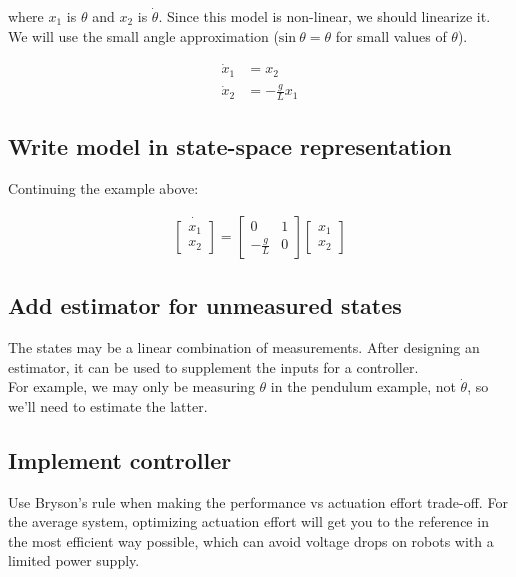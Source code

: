 \documentclass[10pt,conference,compsoc]{IEEEtran}
\begin{document}
where $x_1$ is $\theta$ and $x_2$ is $\dot{\theta}$. Since this model is
non-linear, we should linearize it. We will use the small angle approximation
($\mathrm{sin}~\theta = \theta$ for small values of $\theta$).

\begin{align*}
  \dot{x}_1 &= x_2 \\
  \dot{x}_2 &= -\frac{g}{L} x_1
\end{align*}

\subsection{Write model in state-space representation}

Continuing the example above:

\begin{align}
  \dot{\left[
  \begin{array}{c}
    x_1 \\
    x_2
  \end{array} \right]} = \left[
  \begin{array}{cc}
    0 & 1 \\
    -\frac{g}{L} & 0
  \end{array} \right] \left[
  \begin{array}{c}
    x_1 \\
    x_2
  \end{array} \right]
\end{align}

\subsection{Add estimator for unmeasured states}

The states may be a linear combination of measurements. After designing an
estimator, it can be used to supplement the inputs for a controller. \\

For example, we may only be measuring $\theta$ in the pendulum example, not
$\dot{\theta}$, so we'll need to estimate the latter.

\subsection{Implement controller}

Use Bryson's rule when making the performance vs actuation effort trade-off. For
the average system, optimizing actuation effort will get you to the reference in
the most efficient way possible, which can avoid voltage drops on robots with a
limited power supply.
\end{document}
